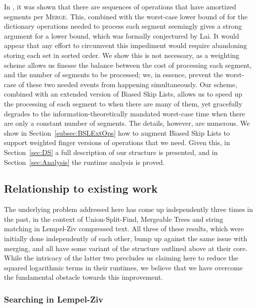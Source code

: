 \documentclass[11pt]{article}
\newcommand{\kwUnion}{Merge}
\newcommand{\Union}{\mbox{\textsc{\kwUnion{}}}}
\newcommand{\segments}{{\segment}s}
\newcommand{\segment}{segment}
\begin{document}
In \cite{klaithesis}, it was shown that there are sequences of operations that have  amortized \segments{} per \Union{}. This, combined with the worst-case lower bound 
of  for the dictionary operations needed to process each \segment{} seemingly gives a strong argument for a  lower bound, which was formally conjectured by Lai. 
It would appear that any effort to circumvent this impediment would require abandoning storing each set in sorted order. 
We show this is not necessary, as a weighting scheme allows us finesse the balance between the cost of processing each \segment{}, and the number of \segments{} to be processed; we, in essence, prevent the worst-case of these two needed events from happening simultaneously. 
Our scheme, combined with an extended version of Biased Skip Lists, allows us 
to speed up the 
processing of each \segment{} to  when there are many of them, yet gracefully degrades to the information-theoretically mandated  worst-case time when there are only a constant number of \segments{}. The details, however, are numerous. We show in Section~\ref{subsec:BSLExtOps} how to augment Biased Skip Lists to support weighted finger versions of operations that we need. Given this, in Section~\ref{sec:DS} a full description of our structure is presented, and in Section~\ref{sec:Analysis} the runtime analysis is proved. 

\subsection{Relationship to existing work} 
\label{sec:previous} 

The underlying problem addressed here has come up independently three times in the past, in the context of Union-Split-Find, Mergeable Trees and string matching in Lempel-Ziv compressed text. All three of these results, which were initially done independently of each other, bump up against the same  issue with merging, and all have some variant of the  structure outlined above at their core. While the intricacy of the latter two precludes us claiming here to reduce the squared logarithmic terms in their runtimes, we believe that we have overcome the fundamental obstacle towards this improvement. 


\subsubsection{Searching in Lempel-Ziv} 
\end{document}
